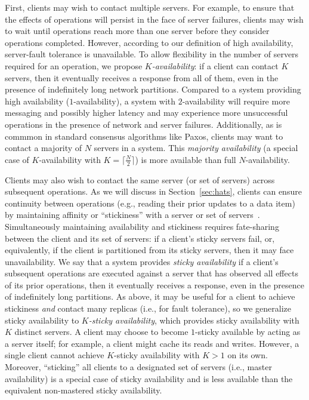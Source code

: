 First, clients may wish to contact multiple servers. For example, to
ensure that the effects of operations will persist in the face of
server failures, clients may wish to wait until operations reach more
than one server before they consider operations completed. However,
according to our definition of high availability, server-fault
tolerance is unavailable. To allow flexibility in the number of
servers required for an operation, we propose
\textit{$K$-availability}: if a client can contact $K$ servers, then
it eventually receives a response from all of them, even in the
presence of indefinitely long network partitions. Compared to a system
providing high availability ($1$-availability), a system with
$2$-availability will require more messaging and possibly higher
latency and may experience more unsuccessful operations in the
presence of network and server failures.  Additionally, as is commmon
in standard consensus algorithms like Paxos, clients may want to
contact a majority of $N$ servers in a system. This \textit{majority
  availability} (a special case of $K$-availability with $K=\lceil
\frac{N}{2} \rceil$) is more available than full $N$-availability.

Clients may also wish to contact the same server (or set of servers)
across subsequent operations. As we will discuss in
Section~\ref{sec:hats}, clients can ensure continuity between
operations (e.g., reading their prior updates to a data item) by
maintaining affinity or ``stickiness'' with a server or set of
servers~\cite{vogels-defs}. Simultaneously maintaining availability
and stickiness requires fate-sharing between the client and its set of
servers: if a client's sticky servers fail, or, equivalently, if the
client is partitioned from its sticky servers, then it may face
unavailability. We say that a system provides \textit{sticky
  availability} if a client's subsequent operations are executed
against a server that has observed all effects of its prior
operations, then it eventually receives a response, even in the
presence of indefinitely long partitions. As above, it may be useful
for a client to achieve stickiness \textit{and} contact many replicas
(i.e., for fault tolerance), so we generalize sticky availability to
\textit{$K$-sticky availability}, which provides sticky availability
with $K$ distinct servers. A client may choose to become $1$-sticky
available by acting as a server itself; for example, a client might
cache its reads and writes. However, a single client cannot achieve
$K$-sticky availability with $K>1$ on its own. Moreover, ``sticking''
all clients to a designated set of servers (i.e., master availability)
is a special case of sticky availability and is less available than
the equivalent non-mastered sticky availability.

